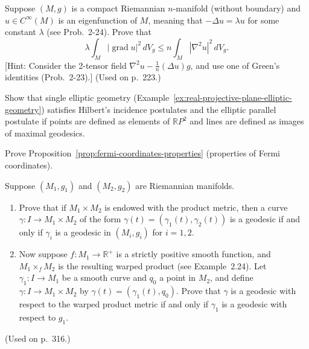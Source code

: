 \begin{exercise}
\label{prob:eigenfunction-laplacian-inequality}

Suppose $(M, g)$ is a compact Riemannian $n$-manifold (without boundary) and $u \in C^\infty(M)$ is an eigenfunction of $M$, meaning that $-\Delta u = \lambda u$ for some constant $\lambda$ (see Prob.\ 2-24). Prove that
\[
\lambda \int_M |\operatorname{grad} u|^2 \, dV_g \le n \int_M |\nabla^2 u|^2 \, dV_g.
\]
[Hint: Consider the 2-tensor field $\nabla^2 u - \frac{1}{n}(\Delta u)g$, and use one of Green's identities (Prob.\ 2-23).] (Used on p.\ 223.)
\end{exercise}

\begin{exercise}
\label{prob:elliptic-geometry-hilbert}

Show that single elliptic geometry (Example~\ref{ex:real-projective-plane-elliptic-geometry}) satisfies Hilbert's incidence postulates and the elliptic parallel postulate if points are defined as elements of $\mathbb{R}P^2$ and lines are defined as images of maximal geodesics.
\end{exercise}

\begin{exercise}
\label{prob:fermi-coordinates}

Prove Proposition~\ref{prop:fermi-coordinates-properties} (properties of Fermi coordinates).
\end{exercise}

\begin{exercise}
\label{prob:geodesics-product-warped-metrics}
\label{prob:geodesic-warped-product}

Suppose $(M_1, g_1)$ and $(M_2, g_2)$ are Riemannian manifolds.
\begin{enumerate}
\item[(a)] Prove that if $M_1 \times M_2$ is endowed with the product metric, then a curve $\gamma: I \to M_1 \times M_2$ of the form $\gamma(t) = (\gamma_1(t), \gamma_2(t))$ is a geodesic if and only if $\gamma_i$ is a geodesic in $(M_i, g_i)$ for $i = 1, 2$.
\item[(b)] Now suppose $f: M_1 \to \mathbb{R}^+$ is a strictly positive smooth function, and $M_1 \times_f M_2$ is the resulting warped product (see Example~2.24). Let $\gamma_1: I \to M_1$ be a smooth curve and $q_0$ a point in $M_2$, and define $\gamma : I \to M_1 \times M_2$ by $\gamma(t) = (\gamma_1(t), q_0)$. Prove that $\gamma$ is a geodesic with respect to the warped product metric if and only if $\gamma_1$ is a geodesic with respect to $g_1$.
\end{enumerate}
(Used on p.\ 316.)
\end{exercise}

